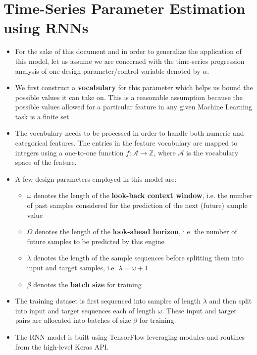 \documentclass{article}
\begin{document}
\section{Time-Series Parameter Estimation using RNNs}
\begin{itemize}
    \item For the sake of this document and in order to generalize the application of this model, let us assume we are concerned with the time-series progression analysis of one design parameter/control variable denoted by $\alpha$.
    \item We first construct a \textbf{vocabulary} for this parameter which helps us bound the possible values it can take on. This is a reasonable assumption because the possible values allowed for a particular feature in any given Machine Learning task is a finite set.
    \item The vocabulary needs to be processed in order to handle both numeric and categorical features. The entries in the feature vocabulary are mapped to integers using a one-to-one function $f: \mathcal{A} \rightarrow \mathbb{Z}$, where $\mathcal{A}$ is the vocabulary space of the feature.
    \item A few design parameters employed in this model are:
    \begin{itemize}
        \item $\omega$ denotes the length of the \textbf{look-back context window}, i.e. the number of past samples considered for the prediction of the next (future) sample value
        \item $\Omega$ denotes the length of the \textbf{look-ahead horizon}, i.e. the number of future samples to be predicted by this engine
        \item $\lambda$ denotes the length of the sample sequences before splitting them into input and target samples, i.e. $\lambda = \omega + 1$
        \item $\beta$ denotes the \textbf{batch size} for training
    \end{itemize}
    \item The training dataset is first sequenced into samples of length $\lambda$ and then split into input and target sequences each of length $\omega$. These input and target pairs are allocated into batches of size $\beta$ for training.
    \item The RNN model is built using TensorFlow leveraging modules and routines from the high-level Keras API.
    \begin{itemize}

\end{itemize}
\end{itemize}
\end{document}
